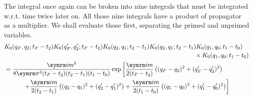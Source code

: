 The integral once again can be broken into nine integrals that must be integrated w.r.t. time twice later on. All those nine integrals have a product of propagator as a multiplier. We shall evaluate those first, separating the primed and unprimed variables.
\begin{align}
    &\begin{multlined}[t]
        K_0(q_F, q_2; t_F - t_2)K_0(q_F', q_2'; t_F - t_2)K_0(q_2, q_1; t_2 - t_1)K_0(q_2, q_1; t_2 - t_1)K_0(q_1, q_0; t_1 - t_0) \\ \times K_0(q_1, q_0; t_1 - t_0)
    \end{multlined} \nonumber \\
    &= \begin{multlined}[t]
        \frac{\im m^3}{8\cpi^3(t_F - t_2)(t_2 - t_1)(t_1 - t_0)}\exp \left[\frac{\im m}{2(t_F - t_2)}\left((q_F - q_2)^2 + (q_F' - q_2')^2\right) \right. \\ \left. + \frac{\im m}{2(t_2 - t_1)}\left((q_2 - q_1)^2 + (q_2' - q_1')^2\right) + \frac{\im m}{2(t_1 - t_0)}\left((q_1 - q_0)^2 + (q_1' - q_0')^2\right)\right]
    \end{multlined}
\end{align}




